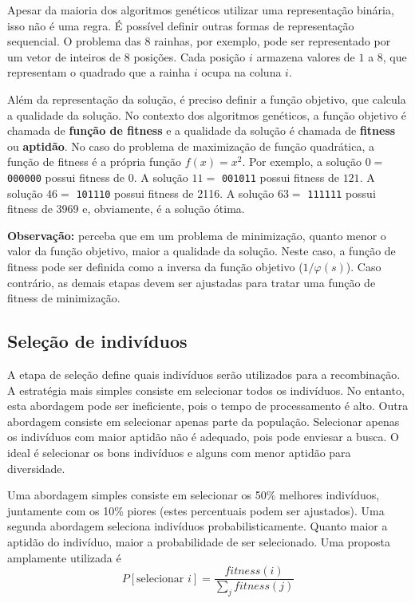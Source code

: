 Apesar da maioria dos algoritmos genéticos utilizar uma representação binária, isso não é uma regra. É possível definir outras formas de representação sequencial. O problema das 8 rainhas, por exemplo, pode ser representado por um vetor de inteiros de 8 posições. Cada posição $i$ armazena valores de $1$ a $8$, que representam o quadrado que a rainha $i$ ocupa na coluna $i$.

Além da representação da solução, é preciso definir a função objetivo, que calcula a qualidade da solução. No contexto dos algoritmos genéticos, a função objetivo é chamada de \textbf{função de fitness} e a qualidade da solução é chamada de \textbf{fitness} ou \textbf{aptidão}. No caso do problema de maximização de função quadrática, a função de fitness é a própria função $f(x) = x^2$. Por exemplo, a solução $0 =$ \texttt{000000} possui fitness de $0$. A solução $11 =$ \texttt{001011} possui fitness de $121$. A solução $46 =$ \texttt{101110} possui fitness de 2116. A solução $63 =$ \texttt{111111} possui fitness de 3969 e, obviamente, é a solução ótima.

\textbf{Observação:} perceba que em um problema de minimização, quanto menor o valor da função objetivo, maior a qualidade da solução. Neste caso, a função de fitness pode ser definida como a inversa da função objetivo ($1/\varphi(s)$). Caso contrário, as demais etapas devem ser ajustadas para tratar uma função de fitness de minimização.

\subsection{Seleção de indivíduos}

A etapa de seleção define quais indivíduos serão utilizados para a recombinação. A estratégia mais simples consiste em selecionar todos os indivíduos. No entanto, esta abordagem pode ser ineficiente, pois o tempo de processamento é alto. Outra abordagem consiste em selecionar apenas parte da população. Selecionar apenas os indivíduos com maior aptidão não é adequado, pois pode enviesar a busca. O ideal é selecionar os bons indivíduos e alguns com menor aptidão para diversidade.

Uma abordagem simples consiste em selecionar os 50\% melhores indivíduos, juntamente com os 10\% piores (estes percentuais podem ser ajustados). Uma segunda abordagem seleciona indivíduos probabilisticamente. Quanto maior a aptidão do indivíduo, maior a probabilidade de ser selecionado. Uma proposta amplamente utilizada é
$$
P[\text{selecionar } i] = \frac{fitness(i)}{\sum_{j} fitness(j)}
$$

